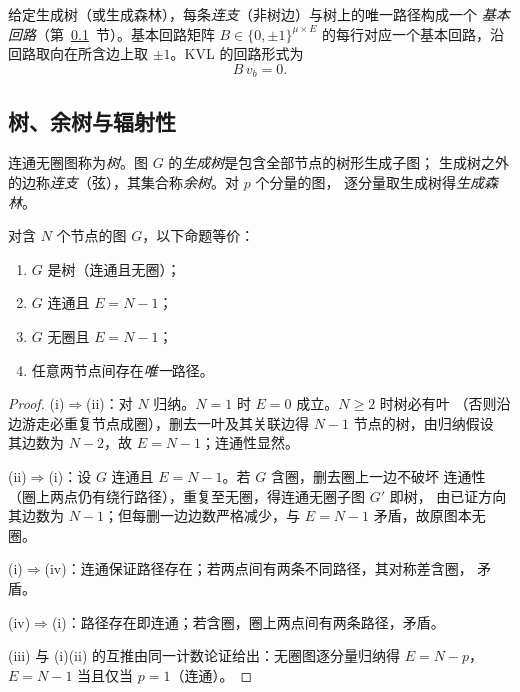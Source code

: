 \begin{definition}[基本回路矩阵]
给定生成树（或生成森林），每条\emph{连支}（非树边）与树上的唯一路径构成一个
\emph{基本回路}（第~\ref{sec:gr-th-tree}~节）。基本回路矩阵
$B\in\{0,\pm1\}^{\mu\times E}$ 的每行对应一个基本回路，沿回路取向在所含边上取
$\pm1$。KVL 的回路形式为
\begin{equation}
B\,v_b=0.
\end{equation}
\end{definition}

\subsection{树、余树与辐射性}\label{sec:gr-th-tree}

\begin{definition}[树、生成树与余树]
连通无圈图称为\emph{树}。图 $G$ 的\emph{生成树}是包含全部节点的树形生成子图；
生成树之外的边称\emph{连支}（弦），其集合称\emph{余树}。对 $p$ 个分量的图，
逐分量取生成树得\emph{生成森林}。
\end{definition}

\begin{theorem}[树的等价刻画]\label{sec:gr-th-tree-equiv}
对含 $N$ 个节点的图 $G$，以下命题等价：
\begin{enumerate}
  \item $G$ 是树（连通且无圈）；
  \item $G$ 连通且 $E=N-1$；
  \item $G$ 无圈且 $E=N-1$；
  \item 任意两节点间存在\emph{唯一}路径。
\end{enumerate}
\end{theorem}
\begin{proof}
(i)$\Rightarrow$(ii)：对 $N$ 归纳。$N=1$ 时 $E=0$ 成立。$N\ge2$ 时树必有叶
（否则沿边游走必重复节点成圈），删去一叶及其关联边得 $N-1$ 节点的树，由归纳假设
其边数为 $N-2$，故 $E=N-1$；连通性显然。

(ii)$\Rightarrow$(i)：设 $G$ 连通且 $E=N-1$。若 $G$ 含圈，删去圈上一边不破坏
连通性（圈上两点仍有绕行路径），重复至无圈，得连通无圈子图 $G'$ 即树，
由已证方向其边数为 $N-1$；但每删一边边数严格减少，与 $E=N-1$ 矛盾，故原图本无圈。

(i)$\Rightarrow$(iv)：连通保证路径存在；若两点间有两条不同路径，其对称差含圈，
矛盾。

(iv)$\Rightarrow$(i)：路径存在即连通；若含圈，圈上两点间有两条路径，矛盾。

(iii) 与 (i)(ii) 的互推由同一计数论证给出：无圈图逐分量归纳得 $E=N-p$，
$E=N-1$ 当且仅当 $p=1$（连通）。
\end{proof}

